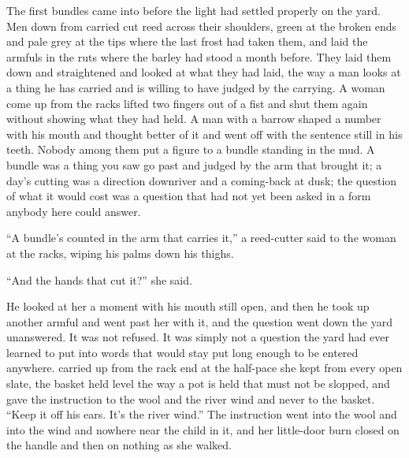 
The first bundles came into  before the light had settled properly on the yard. Men down from  carried cut reed across their shoulders, green at the broken ends and pale grey at the tips where the last frost had taken them, and laid the armfuls in the ruts where the barley had stood a month before. They laid them down and straightened and looked at what they had laid, the way a man looks at a thing he has carried and is willing to have judged by the carrying. A woman come up from the racks lifted two fingers out of a fist and shut them again without showing what they had held. A man with a barrow shaped a number with his mouth and thought better of it and went off with the sentence still in his teeth. Nobody among them put a figure to a bundle standing in the mud. A bundle was a thing you saw go past and judged by the arm that brought it; a day's cutting was a direction downriver and a coming-back at dusk; the question of what it would cost was a question that had not yet been asked in a form anybody here could answer.

“A bundle's counted in the arm that carries it,” a reed-cutter said to the woman at the racks, wiping his palms down his thighs.

“And the hands that cut it?” she said.

He looked at her a moment with his mouth still open, and then he took up another armful and went past her with it, and the question went down the yard unanswered. It was not refused. It was simply not a question the yard had ever learned to put into words that would stay put long enough to be entered anywhere.  carried  up from the rack end at the half-pace she kept from every open slate, the basket held level the way a pot is held that must not be slopped, and gave the instruction to the wool and the river wind and never to the basket. “Keep it off his ears. It's the river wind.” The instruction went into the wool and into the wind and nowhere near the child in it, and her little-door burn closed on the handle and then on nothing as she walked.

